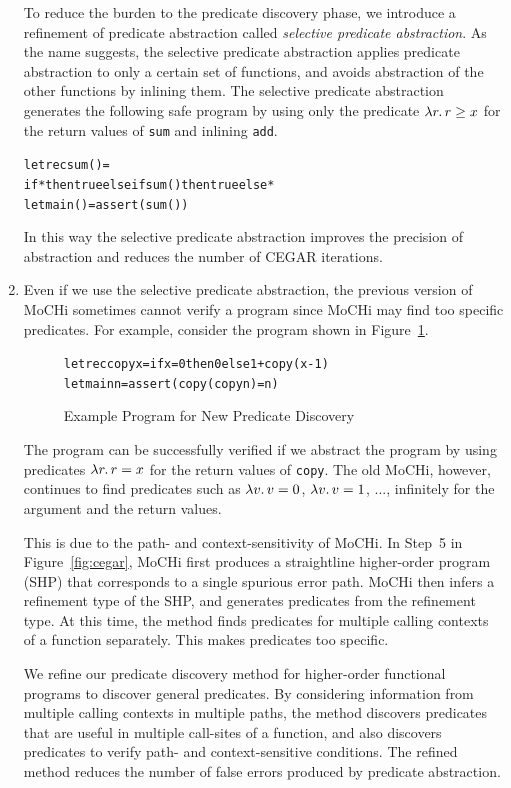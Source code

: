 \begin{enumerate}
      To reduce the burden to the predicate discovery phase, we introduce
      a refinement of predicate abstraction called \emph{selective
      predicate abstraction}.  As the name suggests, the selective
      predicate abstraction applies predicate abstraction to only a
      certain set of functions, and avoids abstraction of the other
      functions by inlining them.  The selective predicate abstraction
      generates the following safe program by using only the
      predicate $\lambda{r}.\,{r \geq x}$ for the return values of \texttt{sum}
      and inlining \texttt{add}.
\begin{alltt}
let rec sum () =
  if * then true else if sum () then true else *
let main () = assert (sum ())
\end{alltt}
      In this way the selective predicate abstraction improves the
      precision of abstraction and reduces the number of CEGAR iterations.

\item Even if we use the selective predicate abstraction, the previous
      version of MoCHi sometimes cannot verify a program since MoCHi may
      find too specific predicates.  For example, consider the program
      shown in Figure~\ref{fig:copy}.
\begin{figure}[t]
\begin{alltt}
let rec copy x = if x=0 then 0 else 1 + copy (x-1)
let main n = assert (copy (copy n) = n)
\end{alltt}
\caption{Example Program for New Predicate Discovery}
\label{fig:copy}
\end{figure}
      The program can be successfully verified if we abstract the
      program by using predicates $\lambda{r}.\,{r = x}$ for the return values
      of \texttt{copy}.  The old MoCHi, however, continues to find
      predicates such as $\lambda{v}.\,{v = 0}$, $\lambda{v}.\,{v = 1}$, ...,
      infinitely for the argument and the return values.

      This is due to the path- and context-sensitivity of MoCHi.
      In Step~5 in Figure~\ref{fig:cegar}, MoCHi first produces a
      straightline higher-order program (SHP) that corresponds to a
      single spurious error path.  MoCHi then infers a refinement type
      of the SHP, and generates predicates from the refinement type.
      At this time, the method finds predicates for multiple
      calling contexts of a function separately.  This makes predicates too
      specific.

      We refine our predicate discovery method for higher-order
      functional programs to discover general predicates.  By
      considering information from multiple calling contexts in multiple
      paths, the method discovers predicates that are useful in multiple
      call-sites of a function, and also discovers predicates to verify
      path- and context-sensitive conditions.  The refined method
      reduces the number of false errors produced by predicate
      abstraction.



\end{enumerate}
